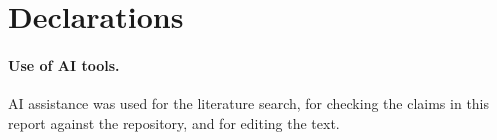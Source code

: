 \documentclass[11pt,a4paper]{article}
\begin{document}
\section*{Declarations}

\paragraph{Use of AI tools.}
AI assistance was used for the literature search, for checking the claims in
this report against the repository, and for editing the text.
\end{document}
